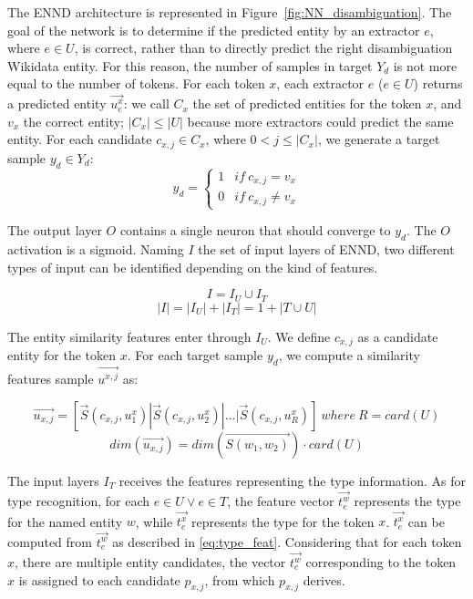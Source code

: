 \documentclass{llncs}
\newcommand{\figref}[1]{\mbox{Figure~\ref{#1}}}
\begin{document}
The ENND architecture is represented in \figref{fig:NN_disambiguation}. The goal of the network is to determine if the predicted entity by an extractor $e$, where $e \in U$, is correct, rather than to directly predict the right disambiguation Wikidata entity. For this reason, the number of samples in target $Y_d$ is not more equal to the number of tokens. For each token $x$, each extractor $e$ ($e \in U$) returns a predicted entity $\vec{u^{x}_{e}}$: we call $C_x$ the set of predicted entities for the token $x$, and  $v_x$ the correct entity; $\left\vert{C_x}\right\vert \leq \left\vert{U}\right\vert$ because more extractors could predict the same entity.
For each candidate $c_{x,j} \in C_x$, where $0 < j \leq \left\vert{C_x}\right\vert$, we generate a target sample $y_d \in Y_d$:
$$y_d  = \left\{\begin{matrix} 
1 & if \: c_{x,j} =  v_x\\
0 & if \: c_{x,j} \neq v_x
\end{matrix}\right.$$

The output layer $O$ contains a single neuron that should converge to $y_d$. The $O$ activation is a sigmoid. Naming $I$ the set of input layers of ENND, two different types of input can be identified depending on the kind of features.

$$I = I_U \cup I_T$$
$$\left\vert{I}\right\vert= \left\vert{I_U}\right\vert + \left\vert{I_T}\right\vert = 1 + \left\vert{T \cup U}\right\vert$$

The entity similarity features enter through $I_U$. We define $c_{x,j}$  as a candidate entity for the token $x$. For each target sample $y_d$, we compute a similarity features sample $\vec{u^{x,j}}$ as:

$$\vec{u_{x,j}} = [\vec{S}(c_{x,j},u^{x}_{1})|\vec{S}(c_{x,j},u^{x}_{2})|...|\vec{S}(c_{x,j},u^{x}_{R})] \: where \: R = card(U)$$
$$dim(\vec{u_{x,j}}) = dim(\vec{S(w_1,w_2)}) \cdot  card(U) $$

The input layers $I_T$ receives the features representing the type information. As for type recognition, for each $e \in U \lor e \in T$, the feature vector $\vec{t^{w}_{e}}$ represents the type for the named entity $w$, while $\vec{t^{x}_{e}}$ represents the type for the token $x$. $\vec{t^{x}_{e}}$ can be computed from $\vec{t^{w}_{e}}$ as described in \ref{eq:type_feat}. Considering that for each token $x$, there are multiple entity candidates, the vector $\vec{t^{w}_{e}}$ corresponding to the token $x$ is assigned to each candidate $p_{x,j}$, from which $p_{x,j}$ derives.
\end{document}
